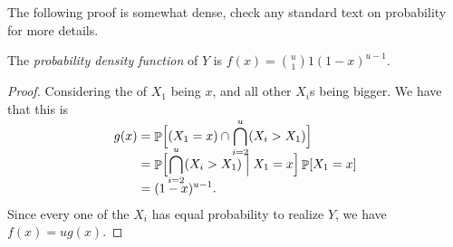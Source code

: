 
The following proof is somewhat dense, check any standard text on
probability for more details.

\begin{lemma}
    The \emph{probability density function} of $Y$ is
    \begin{math}
        f(x) = \binom{u}{1} 1 (1-x)^{u-1}.
    \end{math}
\end{lemma}
\begin{proof}
    Considering the \pdf of $X_1$ being $x$, and all other $X_i$s
    being bigger. We have that this \pdf is
    \begin{align*}
        g(x)
        &=%
        \Prob{ (X_1 = x) \cap \smash{\bigcap_{i=2}^u} (X_i>X_1)\Bigr.}
        \\&=
        \ProbCond{\Bigl. \smash{\bigcap_{i=2}^u} (X_i>X_1)}{X_1=x} \Prob{X_1=x}
        \\&=%
        (1-x)^{u-1}.
    \end{align*}
    Since every one of the $X_i$ has equal probability to realize $Y$,
    we have $f(x) = u g(x)$.
\end{proof}


